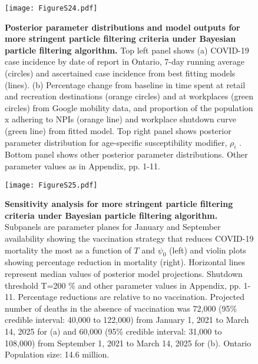 \documentclass[10pt,onecolumn,twoside,lineno]{pnas-new}
\begin{document}
\clearpage 


\begin{figure}[H]
\centering
\texttt{[image: FigureS24.pdf]}
\caption{\textbf{Posterior parameter distributions and model outputs for more stringent particle filtering criteria under Bayesian particle filtering algorithm.} Top left panel shows (a) COVID-19 case incidence by date of report in Ontario, 7-day running average (circles) and ascertained case incidence from best fitting models (lines). (b) Percentage change from baseline in time spent at retail and recreation destinations (orange circles) and at workplaces (green circles) from Google mobility data, and proportion of the population x adhering to NPIs (orange line) and workplace shutdown curve (green line) from fitted model.  Top right panel shows posterior parameter distribution for age-specific susceptibility modifier, $\rho_i$ . Bottom panel shows other posterior parameter distributions. Other parameter values as in Appendix, pp. 1-11.}
\label{plot_model}
\end{figure}

\begin{figure}[H]
\centering
\texttt{[image: FigureS25.pdf]}
\caption{\textbf{Sensitivity analysis for more stringent particle filtering criteria under Bayesian particle filtering algorithm.} Subpanels are parameter planes for January and September availability showing the vaccination strategy that reduces COVID-19 mortality the most as a function of $T$ and $\psi_0$ (left) and violin plots showing percentage reduction in mortality (right).  Horizontal lines represent median values of posterior model projections. Shutdown threshold T=200 \% and other parameter values in Appendix, pp. 1-11. Percentage reductions are relative to no vaccination. Projected number of deaths in the absence of vaccination was 72,000 (95\% credible interval: 40,000 to 122,000) from January 1, 2021 to March 14, 2025 for (a) and 60,000 (95\% credible interval: 31,000 to 108,000) from September 1, 2021 to March 14, 2025 for (b).  Ontario Population size: 14.6 million.}
\label{plot_model}
\end{figure}

\clearpage 
\end{document}
